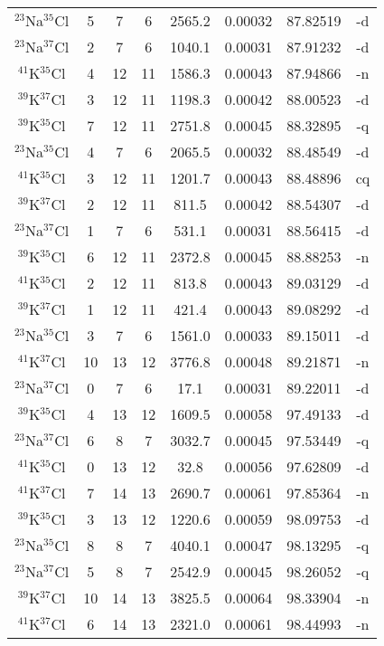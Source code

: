 \begin{table*}[htp]
\begin{tabular}{cccccccc}
$^{23}$Na$^{35}$Cl & 5 & 7 & 6 & 2565.2 & 0.00032 & 87.82519 & -d \\
$^{23}$Na$^{37}$Cl & 2 & 7 & 6 & 1040.1 & 0.00031 & 87.91232 & -d \\
$^{41}$K$^{35}$Cl & 4 & 12 & 11 & 1586.3 & 0.00043 & 87.94866 & -n \\
$^{39}$K$^{37}$Cl & 3 & 12 & 11 & 1198.3 & 0.00042 & 88.00523 & -d \\
$^{39}$K$^{35}$Cl & 7 & 12 & 11 & 2751.8 & 0.00045 & 88.32895 & -q \\
$^{23}$Na$^{35}$Cl & 4 & 7 & 6 & 2065.5 & 0.00032 & 88.48549 & -d \\
$^{41}$K$^{35}$Cl & 3 & 12 & 11 & 1201.7 & 0.00043 & 88.48896 & cq \\
$^{39}$K$^{37}$Cl & 2 & 12 & 11 & 811.5 & 0.00042 & 88.54307 & -d \\
$^{23}$Na$^{37}$Cl & 1 & 7 & 6 & 531.1 & 0.00031 & 88.56415 & -d \\
$^{39}$K$^{35}$Cl & 6 & 12 & 11 & 2372.8 & 0.00045 & 88.88253 & -n \\
$^{41}$K$^{35}$Cl & 2 & 12 & 11 & 813.8 & 0.00043 & 89.03129 & -d \\
$^{39}$K$^{37}$Cl & 1 & 12 & 11 & 421.4 & 0.00043 & 89.08292 & -d \\
$^{23}$Na$^{35}$Cl & 3 & 7 & 6 & 1561.0 & 0.00033 & 89.15011 & -d \\
$^{41}$K$^{37}$Cl & 10 & 13 & 12 & 3776.8 & 0.00048 & 89.21871 & -n \\
$^{23}$Na$^{37}$Cl & 0 & 7 & 6 & 17.1 & 0.00031 & 89.22011 & -d \\
$^{39}$K$^{35}$Cl & 4 & 13 & 12 & 1609.5 & 0.00058 & 97.49133 & -d \\
$^{23}$Na$^{37}$Cl & 6 & 8 & 7 & 3032.7 & 0.00045 & 97.53449 & -q \\
$^{41}$K$^{35}$Cl & 0 & 13 & 12 & 32.8 & 0.00056 & 97.62809 & -d \\
$^{41}$K$^{37}$Cl & 7 & 14 & 13 & 2690.7 & 0.00061 & 97.85364 & -n \\
$^{39}$K$^{35}$Cl & 3 & 13 & 12 & 1220.6 & 0.00059 & 98.09753 & -d \\
$^{23}$Na$^{35}$Cl & 8 & 8 & 7 & 4040.1 & 0.00047 & 98.13295 & -q \\
$^{23}$Na$^{37}$Cl & 5 & 8 & 7 & 2542.9 & 0.00045 & 98.26052 & -q \\
$^{39}$K$^{37}$Cl & 10 & 14 & 13 & 3825.5 & 0.00064 & 98.33904 & -n \\
$^{41}$K$^{37}$Cl & 6 & 14 & 13 & 2321.0 & 0.00061 & 98.44993 & -n \\

\end{tabular}
\end{table*}
